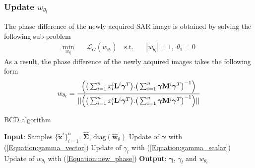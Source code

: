 \subsubsection*{Update $w_{\theta_{l}}$}
The phase difference of the newly acquired \acs{SAR} image is obtained by solving the following sub-problem
\begin{equation}
\label{Equation:problem4}
\begin{aligned}
\min_{w_{\theta_l}} \quad & \mathcal{L}_G(w_{\theta_{l}}) \quad \text{s.t.} \quad & |w_{\theta_{l}}| = 1, \; \theta_1 = 0 
\end{aligned}
\end{equation}
As a result, the phase difference of the newly acquired images takes the following form
\vspace{-10pt} 
\begin{equation}
\label{Equation:new_phase}
\small w_{\theta_l} = \small \frac{\Big( \big(\sum_{i=1}^n x_{l}^{i} \mathbf{L}^i \boldsymbol{\gamma}^T \big) . \big(\sum_{i=1}^n \boldsymbol{\gamma} \mathbf{M}^i \boldsymbol{\gamma}^T \big)^{-1}\Big)}{|| \Big( \big(\sum_{i=1}^n x_{l}^{i} \mathbf{L}^i \boldsymbol{\gamma}^T \big) . \big(\sum_{i=1}^n \boldsymbol{\gamma} \mathbf{M}^i \boldsymbol{\gamma}^T \big)^{-1}\Big) ||}
\end{equation}
\begin{algorithm}
\caption{\ac{BCD} algorithm }
\label{Algorithm:algo_BCD}
\begin{algorithmic}[1]
\State \textbf{Input}: Samples $\{\mathbf{\tilde{x}}^i\}_{i=1}^n$, $\hat{\mathbf{\Sigma}}$, $\text{diag}(\hat{\mathbf{w}}_{\theta})$
\Repeat
    \State Update of $\boldsymbol{\gamma}$ with (\ref{Equation:gamma_vector})
    \State Update of $\gamma_{l}$ with (\ref{Equation:gamma_scalar})
    \State Update of $w_{\theta_{l}}$ with (\ref{Equation:new_phase})
\State \textbf{Output}: $\boldsymbol{\gamma}$, $\gamma_{l}$ and $w_{\theta_{l}}$
\end{algorithmic}
\end{algorithm}
